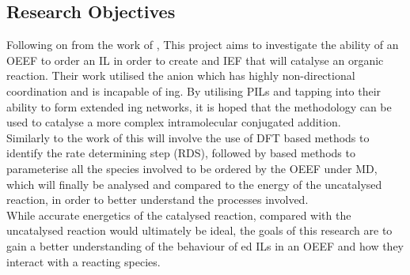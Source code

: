 \subsection{Research Objectives}
Following on from the work of , This project aims to investigate the ability of an OEEF to order an IL in order to create and IEF that will catalyse an organic reaction. Their work utilised the  anion which has highly non-directional coordination and is incapable of {\hb}ing. By utilising PILs and tapping into their ability to form extended {\hb}ing networks, it is hoped that the methodology can be used to catalyse a more complex intramolecular conjugated addition.\\

Similarly to the work of  this will involve the use of DFT based methods to identify the rate determining step (RDS), followed by \ai based methods to parameterise all the species involved to be ordered by the OEEF under MD, which will finally be analysed and compared to the energy of the uncatalysed reaction, in order to better understand the processes involved.\\

While accurate energetics of the catalysed reaction, compared with the uncatalysed reaction would ultimately be ideal, the goals of this research are to gain a better understanding of the behaviour of {\hb}ed ILs in an OEEF and how they interact with a reacting species.
